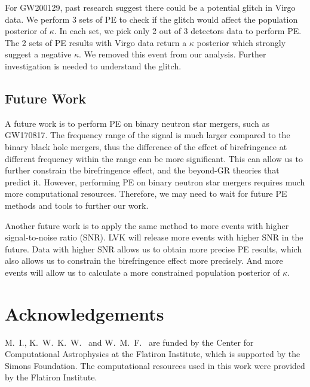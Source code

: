\documentclass[aps,prd,twocolumn,superscriptaddress,preprintnumbers,floatfix,nofootinbib]{revtex4-2}
\begin{document}
For GW200129, past research suggest there could be a potential glitch in Virgo data. \citep{GW200129}
We perform 3 sets of PE to check if the glitch would affect the population posterior of $\kappa$.
In each set, we pick only 2 out of 3 detectors data to perform PE.
The 2 sets of PE results with Virgo data return a $\kappa$ posterior which strongly suggest a negative $\kappa$.
We removed this event from our analysis.
Further investigation is needed to understand the glitch.

\subsection{Future Work}
A future work is to perform PE on binary neutron star mergers, such as GW170817.
The frequency range of the signal is much larger compared to the binary black hole mergers, thus the difference of the effect of birefringence at different frequency within the range can be more significant.
This can allow us to further constrain the birefringence effect, and the beyond-GR theories that predict it.
However, performing PE on binary neutron star mergers requires much more computational resources.
Therefore, we may need to wait for future PE methods and tools to further our work.

Another future work is to apply the same method to more events with higher signal-to-noise ratio (SNR).
LVK will release more events with higher SNR in the future.
Data with higher SNR allows us to obtain more precise PE results, which also allows us to constrain the birefringence effect more precisely.
And more events will allow us to calculate a more constrained population posterior of $\kappa$.

\section{Acknowledgements}
\label{sec:Acknowledgements}
M.~I., K.~W.~K.~W.~ and W.~M.~F.~ are funded by the Center for Computational Astrophysics at the Flatiron Institute, which is supported by the Simons Foundation.
The computational resources used in this work were provided by the Flatiron Institute.


\end{document}
